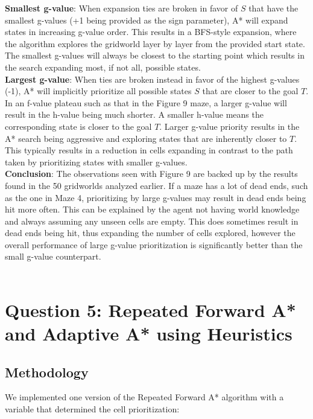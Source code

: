 \documentclass{article}
\begin{document}
\noindent \textbf{Smallest g-value}: When expansion ties are broken in favor of $S$ that have the smallest g-values (+1 being provided as the sign parameter), A* will expand states in increasing g-value order. This results in a BFS-style expansion, where the algorithm explores the gridworld layer by layer from the provided start state. The smallest g-values will always be closest to the starting point which results in the search expanding most, if not all, possible states.\\

\noindent \textbf{Largest g-value}: When ties are broken instead in favor of the highest g-values (-1), A* will implicitly prioritize all possible states $S$ that are closer to the goal $T$. In an f-value plateau such as that in the Figure 9 maze, a larger g-value will result in the h-value being much shorter. A smaller h-value means the corresponding state is closer to the goal $T$. Larger g-value priority results in the A* search being aggressive and exploring states that are inherently closer to $T$. This typically results in a reduction in cells expanding in contrast to the path taken by prioritizing states with smaller g-values.\\

\noindent \textbf{Conclusion}: The observations seen with Figure 9 are backed up by the results found in the 50 gridworlds analyzed earlier. If a maze has a lot of dead ends, such as the one in Maze 4, prioritizing by large g-values may result in dead ends being hit more often. This can be explained by the agent not having world knowledge and always assuming any unseen cells are empty. This does sometimes result in dead ends being hit, thus expanding the number of cells explored, however the overall performance of large g-value prioritization is significantly better than the small g-value counterpart. 
\\ \\

\noindent 
\section*{Question 5: Repeated Forward A* and Adaptive A* using Heuristics}

\subsection*{Methodology}
We implemented one version of the Repeated Forward A* algorithm with a variable that determined the cell prioritization: 
\end{document}
